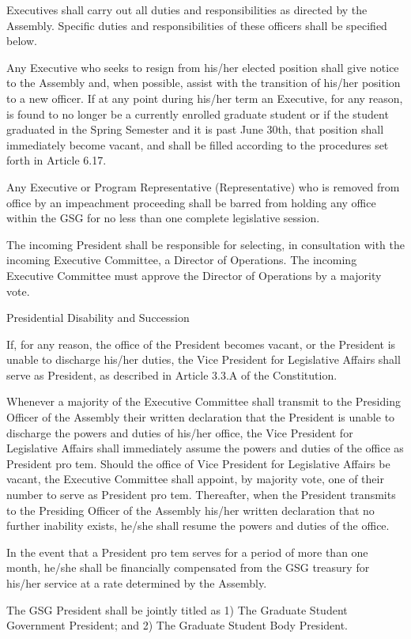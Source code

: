 \begin{bylaws-number}
  \item Executives shall carry out all duties and responsibilities as directed by the Assembly. Specific duties and responsibilities of these officers shall be specified below.
  \item Any Executive who seeks to resign from his/her elected position shall give notice to the Assembly and, when possible, assist with the transition of his/her position to a new officer. If at any point during his/her term an Executive, for any reason, is found to no longer be a currently enrolled graduate student or if the student graduated in the Spring Semester and it is past June 30th, that position shall immediately become vacant, and shall be filled according to the procedures set forth in Article 6.17.
  \item Any Executive or Program Representative (Representative) who is removed from office by an impeachment proceeding shall be barred from holding any office within the GSG for no less than one complete legislative session.
  \item The incoming President shall be responsible for selecting, in consultation with the incoming Executive Committee, a Director of Operations. The incoming Executive Committee must approve the Director of Operations by a majority vote.
  \item Presidential Disability and Succession
  \begin{bylaws-number}
    \item If, for any reason, the office of the President becomes vacant, or the President is unable to discharge his/her duties, the Vice President for Legislative Affairs shall serve as President, as described in Article 3.3.A of the Constitution.
    \item Whenever a majority of the Executive Committee shall transmit to the Presiding Officer of the Assembly their written declaration that the President is unable to discharge the powers and duties of his/her office, the Vice President for Legislative Affairs shall immediately assume the powers and duties of the office as President pro tem. Should the office of Vice President for Legislative Affairs be vacant, the Executive Committee shall appoint, by majority vote, one of their number to serve as President pro tem. Thereafter, when the President transmits to the Presiding Officer of the Assembly his/her written declaration that no further inability exists, he/she shall resume the powers and duties of the office.
    \item In the event that a President pro tem serves for a period of more than one month, he/she shall be financially compensated from the GSG treasury for his/her service at a rate determined by the Assembly.
  \end{bylaws-number}
  \item The GSG President shall be jointly titled as 1) The Graduate Student Government President; and 2) The Graduate Student Body President.
\end{bylaws-number}
